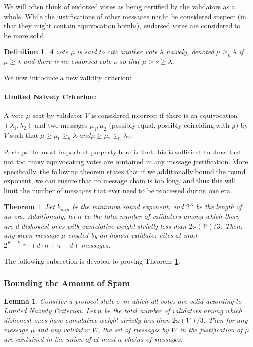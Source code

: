 \documentclass[12pt, fleqn]{article}
\newtheorem{theorem}{Theorem}
\newtheorem{lemma}{Lemma}
\newtheorem{definition}{Definition}
\newcommand{\ww}{\mathbb{w}}
\begin{document}
We will often think of endorsed votes as being certified by the validators as a whole. While the justifications of other messages might be considered suspect (in that they might contain equivocation bombs), endorsed votes are considered to be more solid.
\begin{definition}
A vote $\mu$ is said to cite another vote $\lambda$ \emph{naively}, denoted $\mu \geq_n \lambda$ if $\mu \geq \lambda$ and there is no endorsed vote $\nu$ so that $\mu > \nu \geq \lambda$.
\end{definition}

We now introduce a new validity criterion:

\paragraph{Limited Naivety Criterion:} A vote $\mu$ sent by validator $V$ is considered incorrect if there is an equivocation $(\lambda_1, \lambda_2)$ and two messages $\mu_1, \mu_2$ (possibly equal, possibly coinciding with $\mu$) by $V$ such that $\mu \geq \mu_1 \geq_n \lambda_1 and \mu \geq \mu_2 \geq_n \lambda_2$.

Perhaps the most important property here is that this is sufficient to show that not too many equivocating votes are contained in any message justification.
% 
More specifically, the following theorem states that if we additionally bound the round exponent, we can ensure that no message chain is too long, and thus this will limit the number of messages that ever need to be processed during one era.

\begin{theorem}\label{thm:limit_spam}
Let $k_{min}$ be the minimum round exponent, and $2^K$ be the length of an era. Additionally, let $n$ be the total number of validators among which there are $d$ dishonest ones with cumulative weight strictly less than $2\ww(\mathcal{V})/3$. Then, any given message $\mu$ created by an honest validator cites at most $2^{K-k_{min}}\cdot (d\cdot n + n-d)$ messages.
\end{theorem}
\noindent 
The following subsection is devoted to proving Theorem~\ref{thm:limit_spam}.

\subsubsection{Bounding the Amount of Spam}

\begin{lemma}\label{chainBoundLemma}
Consider a protocol state $\sigma$ in which all votes are valid according to Limited Naivety Criterion. Let $n$ be the total number of validators among which dishonest ones have cumulative weight strictly less than $2\ww(\mathcal{V})/3$. Then for any message $\mu$ and any validator $W$, the set of messages by $W$ in the justification of $\mu$ are contained in the union of at most $n$ chains of messages.
\end{lemma}
\end{document}
